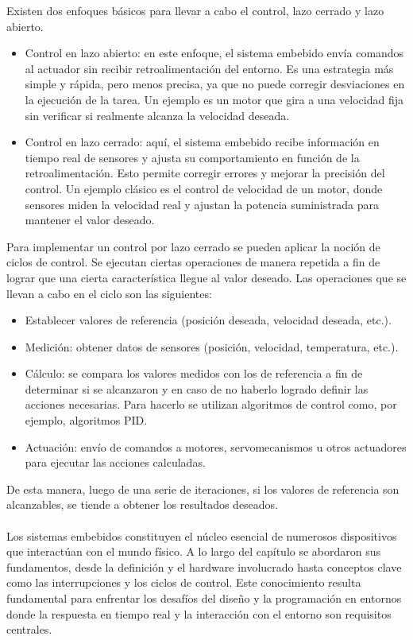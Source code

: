 Existen dos enfoques básicos para llevar a cabo el control, lazo cerrado y lazo abierto.

\begin{itemize}
\item Control en lazo abierto: en este enfoque, el sistema embebido envía comandos al actuador sin recibir retroalimentación del entorno. Es una estrategia más simple y rápida, pero menos precisa, ya que no puede corregir desviaciones en la ejecución de la tarea. Un ejemplo es un motor que gira a una velocidad fija sin verificar si realmente alcanza la velocidad deseada.

\item Control en lazo cerrado: aquí, el sistema embebido recibe información en tiempo real de sensores y ajusta su comportamiento en función de la retroalimentación. Esto permite corregir errores y mejorar la precisión del control. Un ejemplo clásico es el control de velocidad de un motor, donde sensores miden la velocidad real y ajustan la potencia suministrada para mantener el valor deseado.
\end{itemize}

Para implementar un control por lazo cerrado se pueden aplicar la noción de ciclos de control. Se ejecutan ciertas operaciones de manera repetida a fin de lograr que una cierta característica llegue al valor deseado. Las operaciones que se llevan a cabo en el ciclo son las siguientes:

\begin{itemize}
\item Establecer valores de referencia (posición deseada, velocidad deseada, etc.).
\item Medición: obtener datos de sensores (posición, velocidad, temperatura, etc.).
\item Cálculo: se compara los valores medidos con los de referencia a fin de determinar si se alcanzaron y en caso de no haberlo logrado definir las acciones necesarias. Para hacerlo se utilizan algoritmos de control como, por ejemplo, algoritmos \gls{PID}.
\item Actuación: envío de comandos a motores, \gls{servomecanismos} u otros actuadores para ejecutar las acciones calculadas.
\end{itemize}

De esta manera, luego de una serie de iteraciones, si los valores de referencia son alcanzables, se tiende a obtener los resultados deseados.
\\\\
Los sistemas embebidos constituyen el núcleo esencial de numerosos dispositivos que interactúan con el mundo físico. A lo largo del capítulo se abordaron sus fundamentos, desde la definición y el hardware involucrado hasta conceptos clave como las interrupciones y los ciclos de control. Este conocimiento resulta fundamental para enfrentar los desafíos del diseño y la programación en entornos donde la respuesta en tiempo real y la interacción con el entorno son requisitos centrales.
